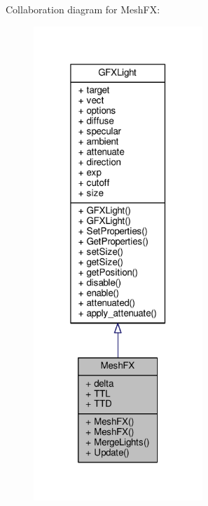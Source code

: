 Collaboration diagram for Mesh\+FX\+:
\nopagebreak
\begin{figure}[H]
\begin{center}
\leavevmode
\includegraphics[width=181pt]{d6/d09/classMeshFX__coll__graph}
\end{center}
\end{figure}
